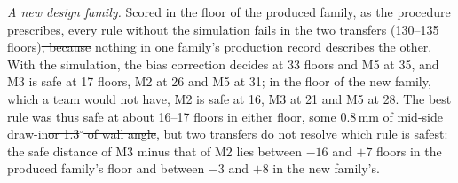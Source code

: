 \documentclass[pdflatex,sn-basic,lineno]{sn-jnl}
\providecommand{\DIFadd}[1]{{\protect\color{blue}\uwave{#1}}} %
\providecommand{\DIFdel}[1]{{\protect\color{red}\sout{#1}}}                      %
\providecommand{\DIFaddbegin}{} %
\providecommand{\DIFaddend}{} %
\providecommand{\DIFdelbegin}{} %
\providecommand{\DIFdelend}{} %
\newcommand{\DIFscaledelfig}{0.5}
\newlength{\DIFdelgraphicswidth} %
\newlength{\DIFdelgraphicsheight} %
\newcommand{\DIFaddincludegraphics}[2][]{{\color{blue}\fbox{\DIFOincludegraphics[#1]{#2}}}} %
\newcommand{\DIFdelincludegraphics}[2][]{%
\sbox{\DIFdelgraphicsbox}{\DIFOincludegraphics[#1]{#2}}%
\settoboxwidth{\DIFdelgraphicswidth}{\DIFdelgraphicsbox} %
\settoboxtotalheight{\DIFdelgraphicsheight}{\DIFdelgraphicsbox} %
\scalebox{\DIFscaledelfig}{%
\parbox[b]{\DIFdelgraphicswidth}{\usebox{\DIFdelgraphicsbox}\\[-\baselineskip] \rule{\DIFdelgraphicswidth}{0em}}\llap{\resizebox{\DIFdelgraphicswidth}{\DIFdelgraphicsheight}{%
\setlength{\unitlength}{\DIFdelgraphicswidth}%
\begin{picture}(1,1)%
\thicklines\linethickness{2pt} %
{\color[rgb]{1,0,0}\put(0,0){\framebox(1,1){}}}%
{\color[rgb]{1,0,0}\put(0,0){\line( 1,1){1}}}%
{\color[rgb]{1,0,0}\put(0,1){\line(1,-1){1}}}%
\end{picture}%
}\hspace*{3pt}}} %
} %
\DeclareRobustCommand{\DIFaddbegin}{\DIFOaddbegin \let\includegraphics\DIFaddincludegraphics} %
\DeclareRobustCommand{\DIFaddend}{\DIFOaddend \let\includegraphics\DIFOincludegraphics} %
\DeclareRobustCommand{\DIFdelbegin}{\DIFOdelbegin \let\includegraphics\DIFdelincludegraphics} %
\DeclareRobustCommand{\DIFdelend}{\DIFOaddend \let\includegraphics\DIFOincludegraphics} %
\begin{document}
\emph{A new design family.} Scored in the floor of the produced family, as the procedure prescribes, every rule without the simulation fails in the two transfers (130--135 floors)\DIFdelbegin \DIFdel{, because }\DIFdelend \DIFaddbegin \DIFadd{: }\DIFaddend nothing in one family's production record describes the other. With the simulation, the bias correction decides at 33 floors and M5 at 35, and M3 is safe at 17 floors, M2 at 26 and M5 at 31; in the floor of the new family, which a team would not have, M2 is safe at 16, M3 at 21 and M5 at 28. The best rule was thus safe at about 16--17 floors in either floor, some 0.8\,mm of mid-side draw-in\DIFdelbegin \DIFdel{or 1.3$^\circ$ of wall angle}\DIFdelend , but two transfers do not resolve which rule is safest: the safe distance of M3 minus that of M2 lies between $-16$ and $+7$ floors in the produced family's floor and between $-3$ and $+8$ in the new family's.
\end{document}
